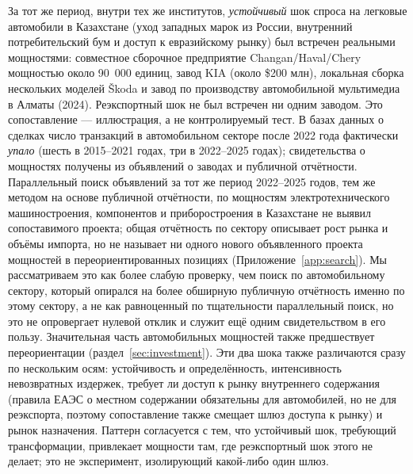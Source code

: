 \documentclass[12pt]{article}
\begin{document}
За тот же период, внутри тех же институтов, \emph{устойчивый} шок спроса на легковые
автомобили в Казахстане (уход западных марок из России, внутренний потребительский бум и
доступ к евразийскому рынку) был встречен реальными мощностями: совместное
сборочное предприятие Changan/Haval/Chery мощностью около 90~000 единиц, завод KIA
(около \$200 млн), локальная сборка нескольких моделей \v{S}koda и завод по производству
автомобильной мультимедиа в Алматы (2024). Реэкспортный шок не был встречен ни одним
заводом. Это сопоставление — иллюстрация, а не контролируемый тест. В базах данных о сделках
число транзакций в автомобильном секторе после 2022 года фактически \emph{упало} (шесть в
2015--2021 годах, три в 2022--2025 годах); свидетельства о мощностях получены из объявлений
о заводах и публичной отчётности. Параллельный поиск объявлений за тот же период
2022--2025 годов, тем же методом на основе публичной отчётности, по мощностям
электротехнического машиностроения, компонентов и приборостроения в Казахстане не выявил
сопоставимого проекта; общая отчётность по сектору описывает рост рынка и объёмы импорта, но
не называет ни одного нового объявленного проекта мощностей в переориентированных позициях
(Приложение~\ref{app:search}). Мы рассматриваем это как более слабую проверку, чем поиск по
автомобильному сектору, который опирался на более обширную публичную отчётность именно по
этому сектору, а не как равноценный по тщательности параллельный поиск, но это не
опровергает нулевой отклик и служит ещё одним свидетельством в его пользу. Значительная
часть автомобильных мощностей также предшествует переориентации (раздел~\ref{sec:investment}).
Эти два шока также различаются сразу по нескольким осям: устойчивость и определённость,
интенсивность невозвратных издержек, требует ли доступ к рынку внутреннего содержания
(правила ЕАЭС о местном содержании обязательны для автомобилей, но не для реэкспорта,
поэтому сопоставление также смещает шлюз доступа к рынку) и рынок назначения. Паттерн
согласуется с тем, что устойчивый шок, требующий трансформации, привлекает мощности там, где
реэкспортный шок этого не делает; это не эксперимент, изолирующий какой-либо один шлюз.
\end{document}
